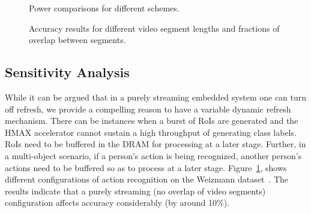 \begin{figure}[ht!]
\begin{minipage}[t]{0.48\linewidth}
\centering
{}
\caption{\label{fig:PowerResults} Power comparisons for different schemes.}
\end{minipage}
\hspace{0.1in}
\begin{minipage}[t]{0.48\linewidth}
\centering
{}
\caption{\label{fig:ActionRecognition} Accuracy results for different video segment lengths and fractions of overlap between segments.}
\end{minipage}
\vspace{-0.2in}
\end{figure}

\subsection{Sensitivity Analysis}
While it can be argued that in a purely streaming embedded system one can turn off refresh, we provide a compelling reason to have a variable dynamic refresh mechanism. There can be instances when a burst of RoIs are generated and the HMAX accelerator cannot sustain a high throughput of generating class labels. RoIs need to be buffered in the DRAM for processing at a later stage. 
Further, in a multi-object scenario, if a person's action is being recognized, another person's actions need to be buffered so as to process at a later stage. Figure~\ref{fig:ActionRecognition}, shows different configurations of action recognition on the Weizmann dataset~\cite{Weizmann}. The results indicate that a purely streaming (no overlap of video segments) configuration affects accuracy considerably (by around 10\%).  



